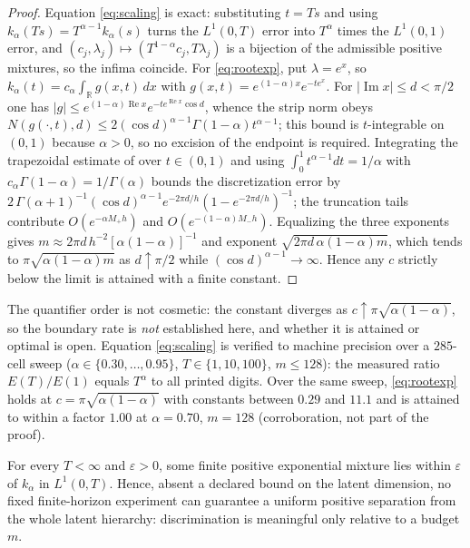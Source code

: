 \documentclass[mathematics,article,accept,pdftex,moreauthors]{Definitions/mdpi}
\DeclareMathOperator{\Real}{Re}
\DeclareMathOperator{\Imag}{Im}
\begin{document}
\begin{proof}
Equation \eqref{eq:scaling} is exact: substituting $t=Ts$ and using $k_{\alpha}(Ts)=T^{\alpha-1}k_{\alpha}(s)$ turns the $L^{1}(0,T)$ error into $T^{\alpha}$ times the $L^{1}(0,1)$ error, and $(c_{j},\lambda_{j})\mapsto(T^{1-\alpha}c_{j},T\lambda_{j})$ is a bijection of the admissible positive mixtures, so the infima coincide. For \eqref{eq:rootexp}, put $\lambda=e^{x}$, so $k_{\alpha}(t)=c_{\alpha}\int_{\mathbb{R}}g(x,t)\,dx$ with $g(x,t)=e^{(1-\alpha)x}e^{-te^{x}}$. For $|\Imag x|\le d<\pi/2$ one has $|g|\le e^{(1-\alpha)\Real x}e^{-te^{\Real x}\cos d}$, whence the strip norm obeys $N(g(\cdot,t),d)\le 2(\cos d)^{\alpha-1}\Gamma(1-\alpha)t^{\alpha-1}$; this bound is $t$-integrable on $(0,1)$ because $\alpha>0$, so no excision of the endpoint is required. Integrating the trapezoidal estimate of \cite{Trefethen2014} over $t\in(0,1)$ and using $\int_{0}^{1}t^{\alpha-1}dt=1/\alpha$ with $c_{\alpha}\Gamma(1-\alpha)=1/\Gamma(\alpha)$ bounds the discretization error by $2\,\Gamma(\alpha+1)^{-1}(\cos d)^{\alpha-1}e^{-2\pi d/h}(1-e^{-2\pi d/h})^{-1}$; the truncation tails contribute $O(e^{-\alpha M_{+}h})$ and $O(e^{-(1-\alpha)M_{-}h})$. Equalizing the three exponents gives $m\approx 2\pi d\,h^{-2}[\alpha(1-\alpha)]^{-1}$ and exponent $\sqrt{2\pi d\,\alpha(1-\alpha)m}$, which tends to $\pi\sqrt{\alpha(1-\alpha)m}$ as $d\uparrow\pi/2$ while $(\cos d)^{\alpha-1}\to\infty$. Hence any $c$ strictly below the limit is attained with a finite constant.
\end{proof}

The quantifier order is not cosmetic: the constant diverges as $c\uparrow\pi\sqrt{\alpha(1-\alpha)}$, so the boundary rate is \emph{not} established here, and whether it is attained or optimal is open. Equation \eqref{eq:scaling} is verified to machine precision over a $285$-cell sweep ($\alpha\in\{0.30,\dots,0.95\}$, $T\in\{1,10,100\}$, $m\le128$): the measured ratio $E(T)/E(1)$ equals $T^{\alpha}$ to all printed digits. Over the same sweep, \eqref{eq:rootexp} holds at $c=\pi\sqrt{\alpha(1-\alpha)}$ with constants between $0.29$ and $11.1$ and is attained to within a factor $1.00$ at $\alpha=0.70$, $m=128$ (corroboration, not part of the proof).

\begin{Corollary}
\label{cor:closure}
For every $T<\infty$ and $\varepsilon>0$, some finite positive exponential mixture lies within $\varepsilon$ of $k_{\alpha}$ in $L^{1}(0,T)$. Hence, absent a declared bound on the latent dimension, no fixed finite-horizon experiment can guarantee a uniform positive separation from the whole latent hierarchy: discrimination is meaningful only relative to a budget $m$.
\end{Corollary}
\end{document}
